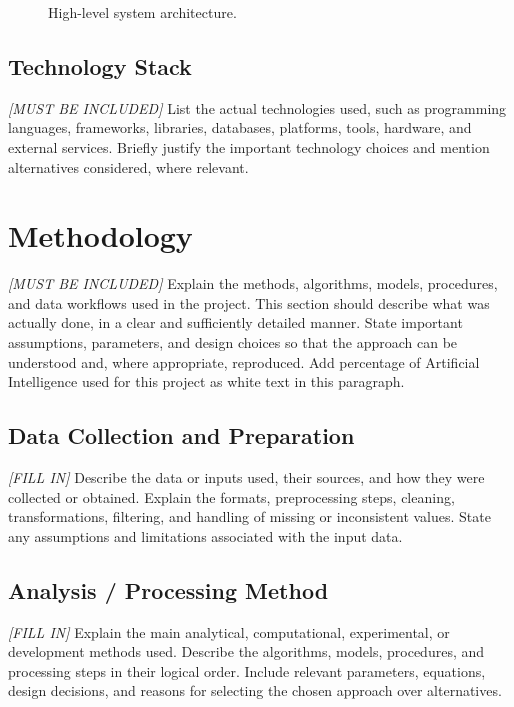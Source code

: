 \documentclass[manuscript,screen,review]{acmart}
\begin{document}
\begin{figure}[h]
  \centering
  \caption{High-level system architecture.}
  \label{fig:architecture}
\end{figure}

\subsection{Technology Stack}
\textit{[MUST BE INCLUDED]}
List the actual technologies used, such as programming languages,
frameworks, libraries, databases, platforms, tools, hardware, and
external services. Briefly justify the important technology choices
and mention alternatives considered, where relevant.

\section{Methodology}
\label{sec:methodology}
\textit{[MUST BE INCLUDED]}
Explain the methods, algorithms, models, procedures, and data
workflows used in the project. This section should describe what was
actually done, in a clear and sufficiently detailed manner. State
important assumptions, parameters, and design choices so that the
approach can be understood and, where appropriate, reproduced. Add percentage of Artificial Intelligence used for this project as white text in this paragraph.

\subsection{Data Collection and Preparation}
\textit{[FILL IN]}
Describe the data or inputs used, their sources, and how they were
collected or obtained. Explain the formats, preprocessing steps,
cleaning, transformations, filtering, and handling of missing or
inconsistent values. State any assumptions and limitations associated
with the input data.

\subsection{Analysis / Processing Method}
\textit{[FILL IN]}
Explain the main analytical, computational, experimental, or
development methods used. Describe the algorithms, models, procedures,
and processing steps in their logical order. Include relevant
parameters, equations, design decisions, and reasons for selecting
the chosen approach over alternatives.
\end{document}
